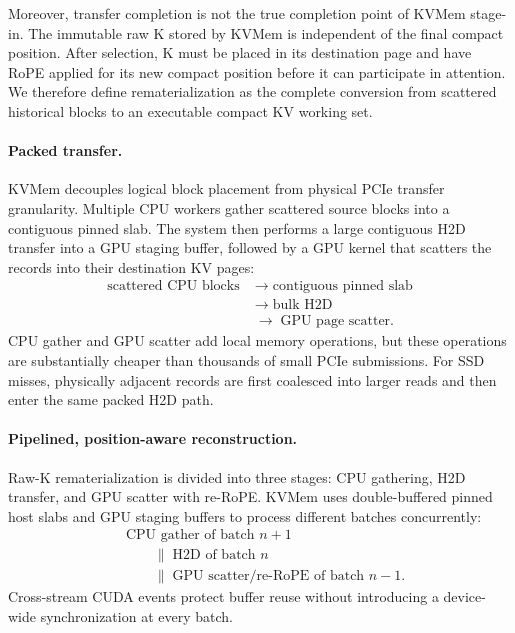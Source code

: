 Moreover, transfer completion is not the true completion point of KVMem
stage-in.  The immutable raw K stored by KVMem is independent of the final
compact position.  After selection, K must be placed in its destination page
and have RoPE applied for its new compact position before it can participate in
attention.  We therefore define rematerialization as the complete conversion
from scattered historical blocks to an executable compact KV working set.

\paragraph{Packed transfer.}
KVMem decouples logical block placement from physical PCIe transfer
granularity.  Multiple CPU workers gather scattered source blocks into a
contiguous pinned slab.  The system then performs a large contiguous H2D
transfer into a GPU staging buffer, followed by a GPU kernel that scatters the
records into their destination KV pages:
\begin{equation}
\begin{split}
  \text{scattered CPU blocks}
  &\;\rightarrow\; \text{contiguous pinned slab}\\
  &\;\rightarrow\; \text{bulk H2D}\\
  &\;\rightarrow\; \text{GPU page scatter}.
\end{split}
\label{eq:packed-stagein}
\end{equation}
CPU gather and GPU scatter add local memory operations, but these operations
are substantially cheaper than thousands of small PCIe submissions.  For SSD
misses, physically adjacent records are first coalesced into larger reads and
then enter the same packed H2D path.

\paragraph{Pipelined, position-aware reconstruction.}
Raw-K rematerialization is divided into three stages: CPU gathering, H2D
transfer, and GPU scatter with re-RoPE.  KVMem uses double-buffered pinned host
slabs and GPU staging buffers to process different batches concurrently:
\begin{equation}
\begin{split}
  &\text{CPU gather of batch } n+1\\
  &\qquad\parallel\; \text{H2D of batch } n\\
  &\qquad\parallel\; \text{GPU scatter/re-RoPE of batch } n-1.
\end{split}
\label{eq:rematerialization-pipeline}
\end{equation}
Cross-stream CUDA events protect buffer reuse without introducing a
device-wide synchronization at every batch.


